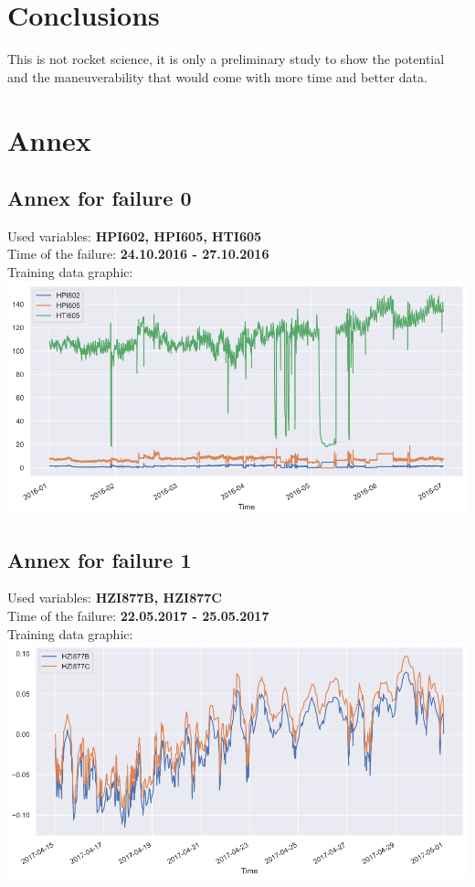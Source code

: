\documentclass[
]{article}
\begin{document}
\hypertarget{conclusions}{%
\section{Conclusions}\label{conclusions}}

This is not rocket science, it is only a preliminary study to show the
potential and the maneuverability that would come with more time and
better data.

\pagebreak

\hypertarget{annex}{%
\section{Annex}\label{annex}}

\hypertarget{annex-for-failure-0}{%
\subsection{Annex for failure 0}\label{annex-for-failure-0}}

Used variables: \textbf{HPI602, HPI605, HTI605}\\
Time of the failure: \textbf{24.10.2016 - 27.10.2016}\\
Training data graphic:\\
\includegraphics{relevant_graphs/train_fail0.png}

\hypertarget{annex-for-failure-1}{%
\subsection{Annex for failure 1}\label{annex-for-failure-1}}

Used variables: \textbf{HZI877B, HZI877C}\\
Time of the failure: \textbf{22.05.2017 - 25.05.2017}\\
Training data graphic:\\
\includegraphics{relevant_graphs/train_fail1.png}
\end{document}
